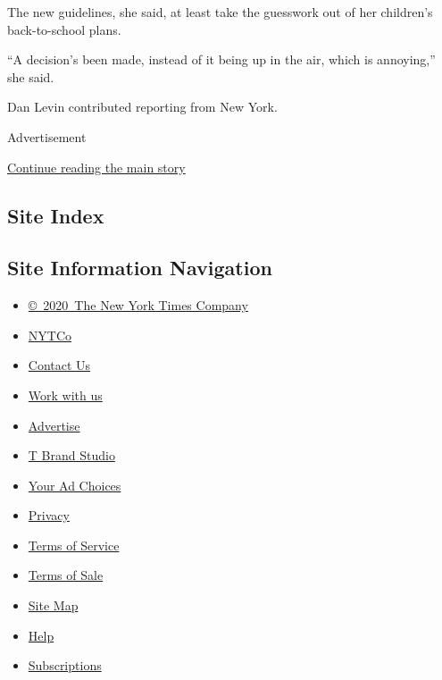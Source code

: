 The new guidelines, she said, at least take the guesswork out of her
children's back-to-school plans.

``A decision's been made, instead of it being up in the air, which is
annoying,'' she said.

Dan Levin contributed reporting from New York.

Advertisement

\protect\hyperlink{after-bottom}{Continue reading the main story}

\hypertarget{site-index}{%
\subsection{Site Index}\label{site-index}}

\hypertarget{site-information-navigation}{%
\subsection{Site Information
Navigation}\label{site-information-navigation}}

\begin{itemize}
\tightlist
\item
  \href{https://help.nytimes.com/hc/en-us/articles/115014792127-Copyright-notice}{©~2020~The
  New York Times Company}
\end{itemize}

\begin{itemize}
\tightlist
\item
  \href{https://www.nytco.com/}{NYTCo}
\item
  \href{https://help.nytimes.com/hc/en-us/articles/115015385887-Contact-Us}{Contact
  Us}
\item
  \href{https://www.nytco.com/careers/}{Work with us}
\item
  \href{https://nytmediakit.com/}{Advertise}
\item
  \href{http://www.tbrandstudio.com/}{T Brand Studio}
\item
  \href{https://www.nytimes.com/privacy/cookie-policy\#how-do-i-manage-trackers}{Your
  Ad Choices}
\item
  \href{https://www.nytimes.com/privacy}{Privacy}
\item
  \href{https://help.nytimes.com/hc/en-us/articles/115014893428-Terms-of-service}{Terms
  of Service}
\item
  \href{https://help.nytimes.com/hc/en-us/articles/115014893968-Terms-of-sale}{Terms
  of Sale}
\item
  \href{https://spiderbites.nytimes.com}{Site Map}
\item
  \href{https://help.nytimes.com/hc/en-us}{Help}
\item
  \href{https://www.nytimes.com/subscription?campaignId=37WXW}{Subscriptions}
\end{itemize}
